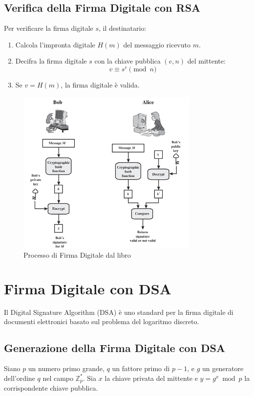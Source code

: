 \documentclass[a4paper,12pt]{report}
\begin{document}
\subsection*{Verifica della Firma Digitale con RSA}
Per verificare la firma digitale $s$, il destinatario:

\begin{enumerate}
    \item Calcola l'impronta digitale $H(m)$ del messaggio ricevuto $m$.
    \item Decifra la firma digitale $s$ con la chiave pubblica $(e, n)$ del mittente:
    \[v \equiv s^e \pmod{n}\]
    \item Se $v = H(m)$, la firma digitale è valida.
\end{enumerate}

\begin{figure}[ht]
    \centering
    \includegraphics[width=0.8\textwidth]{img/digital_signature_process.png}
    \caption{Processo di Firma Digitale dal libro \cite{stallings2011cryptography}}
    \label{fig:digital_signature_process}
\end{figure}

\section{Firma Digitale con DSA}
Il Digital Signature Algorithm (DSA) è uno standard per la firma digitale di documenti elettronici basato sul problema del logaritmo discreto.

\subsection*{Generazione della Firma Digitale con DSA}
Siano $p$ un numero primo grande, $q$ un fattore primo di $p - 1$, e $g$ un generatore dell'ordine $q$ nel campo $\mathbb{Z}_p^*$. Sia $x$ la chiave privata del mittente e $y = g^x \bmod p$ la corrispondente chiave pubblica.
\end{document}
